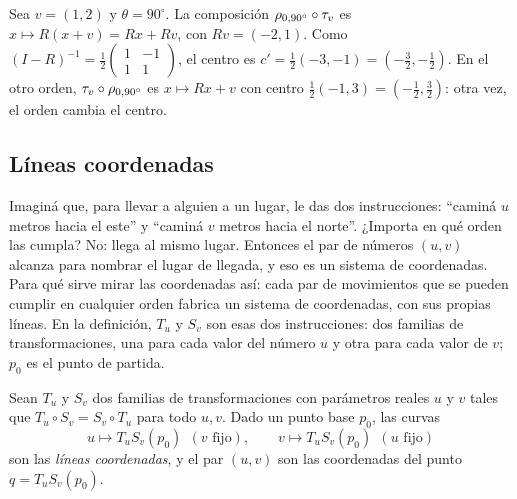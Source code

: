 \begin{ejemplo}\label{ej:punto-fijo-composicion}
Sea \(v=(1,2)\) y \(\theta=90^\circ\). La composición \(\rho_{0,90^\circ}\circ\tau_v\) es
\(x\mapsto R(x+v)=Rx+Rv\), con \(Rv=(-2,1)\). Como
\((I-R)^{-1}=\tfrac12\left(\begin{smallmatrix}1&-1\\1&1\end{smallmatrix}\right)\), el centro es
\(c'=\tfrac12(-3,-1)=(-\tfrac32,-\tfrac12)\). En el otro orden, \(\tau_v\circ\rho_{0,90^\circ}\) es
\(x\mapsto Rx+v\) con centro \(\tfrac12(-1,3)=(-\tfrac12,\tfrac32)\): otra vez, el orden cambia el centro.
\end{ejemplo}

\subsection{Líneas coordenadas}\label{sec:lineas-coordenadas}

Imaginá que, para llevar a alguien a un lugar, le das dos instrucciones: \enquote{caminá \(u\)
metros hacia el este} y \enquote{caminá \(v\) metros hacia el norte}. ¿Importa en qué orden las
cumpla? No: llega al mismo lugar. Entonces el par de números \((u,v)\) alcanza para nombrar el
lugar de llegada, y eso es un sistema de coordenadas. Para qué sirve mirar las coordenadas
así: cada par de movimientos que se pueden cumplir en cualquier orden fabrica un sistema de
coordenadas, con sus propias líneas. En la definición, \(T_u\) y \(S_v\) son esas dos
instrucciones: dos familias de transformaciones, una para cada valor del número \(u\) y otra
para cada valor de \(v\); \(p_0\) es el punto de partida.

\begin{definicion}\label{def:lineas-coordenadas}
Sean \(T_u\) y \(S_v\) dos familias de transformaciones con parámetros reales \(u\) y \(v\) tales
que \(T_u\circ S_v=S_v\circ T_u\) para todo \(u,v\). Dado un punto base \(p_0\), las curvas
\[
u\mapsto T_uS_v(p_0)\ \ (v\text{ fijo}),\qquad v\mapsto T_uS_v(p_0)\ \ (u\text{ fijo})
\]
son las \emph{líneas coordenadas}, y el par \((u,v)\) son las coordenadas del punto
\(q=T_uS_v(p_0)\).
\end{definicion}

